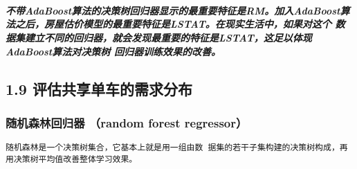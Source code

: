 \documentclass[11pt]{article}
\begin{document}
    \begin{center}
    \end{center}
    { \hspace*{\fill} \\}
    
    \begin{center}
    \end{center}
    { \hspace*{\fill} \\}
    
    \subparagraph{不带AdaBoost算法的决策树回归器显示的最重要特征是RM。加入AdaBoost算法之后，房屋估价模型的最重要特征是LSTAT。在现实生活中，如果对这个
数据集建立不同的回归器，就会发现最重要的特征是LSTAT，这足以体现AdaBoost算法对决策树
回归器训练效果的改善。}\label{ux4e0dux5e26adaboostux7b97ux6cd5ux7684ux51b3ux7b56ux6811ux56deux5f52ux5668ux663eux793aux7684ux6700ux91cdux8981ux7279ux5f81ux662frmux52a0ux5165adaboostux7b97ux6cd5ux4e4bux540eux623fux5c4bux4f30ux4ef7ux6a21ux578bux7684ux6700ux91cdux8981ux7279ux5f81ux662flstatux5728ux73b0ux5b9eux751fux6d3bux4e2dux5982ux679cux5bf9ux8fd9ux4e2a-ux6570ux636eux96c6ux5efaux7acbux4e0dux540cux7684ux56deux5f52ux5668ux5c31ux4f1aux53d1ux73b0ux6700ux91cdux8981ux7684ux7279ux5f81ux662flstatux8fd9ux8db3ux4ee5ux4f53ux73b0adaboostux7b97ux6cd5ux5bf9ux51b3ux7b56ux6811-ux56deux5f52ux5668ux8badux7ec3ux6548ux679cux7684ux6539ux5584}

    \subsection{1.9
评估共享单车的需求分布}\label{ux8bc4ux4f30ux5171ux4eabux5355ux8f66ux7684ux9700ux6c42ux5206ux5e03}

    \subsubsection{随机森林回归器 （random forest
regressor）}\label{ux968fux673aux68eeux6797ux56deux5f52ux5668-random-forest-regressor}

\begin{verbatim}
随机森林是一个决策树集合，它基本上就是用一组由数 据集的若干子集构建的决策树构成，再用决策树平均值改善整体学习效果。 
\end{verbatim}
\end{document}
